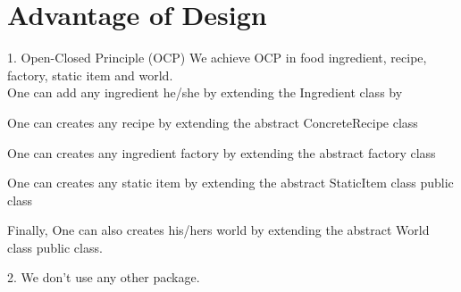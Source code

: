 \section{Advantage of Design}

1.	Open-Closed Principle (OCP)
    We achieve OCP in food ingredient, recipe, factory, static item and world.\\
    One can add any ingredient he/she by extending the Ingredient class by 


One can creates any recipe by extending the abstract ConcreteRecipe class


One can creates any ingredient factory by extending the abstract factory class


One can creates any static item by extending the abstract StaticItem class public class


Finally, One can also creates his/hers world by extending the abstract World class public class.

2. We don't use any other package.
